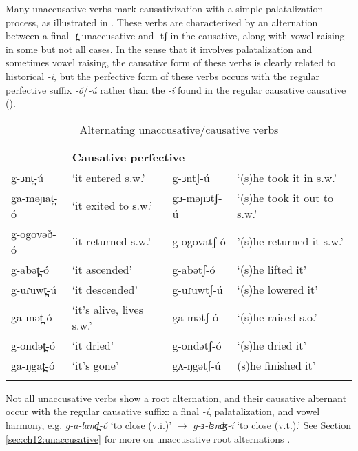 Many unaccusative verbs mark causativization with a simple palatalization process, as illustrated in . These verbs are characterized by an alternation between a final \textit{-t̪ } unaccusative and {-tʃ} in the causative, along with vowel raising in some but not all cases. In the sense that it involves palatalization and sometimes vowel raising, the causative form of these verbs is clearly related to historical \textit{-i}, but the perfective form of these verbs occurs with the regular perfective suffix \textit{-ó}/\textit{-ú} rather than the \textit{-í} found in the regular causative causative (). 

\begin{table}
\begin{tabular}[t]{llll}
\lsptoprule
\multicolumn{2}{l}{Unaccusative perfective}	& 	\multicolumn{2}{l}{Causative perfective} \\
\midrule
g-ɜnt̪-ú		& `it entered s.w.'	& g-ɜntʃ-ú	&	`(s)he took it in s.w.' \\
ga-məɲat̪-ó 	& `it exited to s.w.' & 	gɜ-məɲɜtʃ-ú 	& `(s)he took it out to s.w.' \\
g-ogovəð-ó	& 'it returned s.w.' & g-ogovatʃ-ó	& 	'(s)he returned it s.w.' \\
g-abət̪-ó 	& `it ascended' & g-abətʃ-ó &  `(s)he lifted it' \\  
g-uɾuwt̪-ú 	& `it descended' & g-uɾuwtʃ-ú &  `(s)he lowered it' \\
ga-mət̪-ó 	& `it's alive, lives s.w.' & ga-mətʃ-ó &  `(s)he raised s.o.' \\
g-ondət̪-ó 	& `it dried' & 	g-ondətʃ-ó 	& ‘(s)he dried it’ \\
ga-ŋgat̪-ó	& `it's gone’  &  gʌ-ŋgətʃ-ú & (s)he finished it' \\
\lspbottomrule
  	 \end{tabular}
\caption{Alternating unaccusative/causative verbs}	\label{tab:ch11:ucalt} 
\end{table}
Not all unaccusative verbs show a root alternation, and their causative alternant occur with the regular causative suffix: a final \textit{-í}, palatalization, and vowel harmony, e.g. \textit{g-a-land̪-ó} `to close (v.i.)' $\rightarrow$ \textit{g-ɜ-lɜnʤ-í} ‘to close (v.t.).’ See Section \ref{sec:ch12:unaccusative} for more on unaccusative root alternations .%


